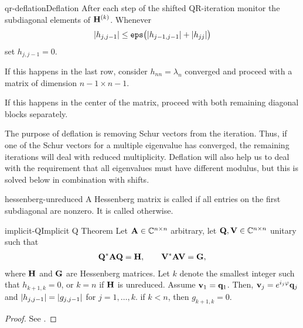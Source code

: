 \begin{Algorithm*}{qr-deflation}{Deflation}
  After each step of the shifted QR-iteration monitor the subdiagonal
  elements of $\mathbf H^{(k)}$. Whenever
  \begin{gather}
    \lvert h_{j,j-1}\rvert \le \texttt{eps} \bigl(\lvert h_{j-1,j-1}\rvert+\lvert h_{jj}\rvert\bigr)
  \end{gather}
  set $h_{j,j-1}=0$.

  If this happens in the last row, consider $h_{nn}=\lambda_n$
  converged and proceed with a matrix of dimension $n-1\times n-1$.

  If this happens in the center of the matrix, proceed with both
  remaining diagonal blocks separately.
\end{Algorithm*}

\begin{remark}
  The purpose of deflation is removing Schur vectors from the
  iteration. Thus, if one of the Schur vectors for a multiple
  eigenvalue has converged, the remaining iterations will deal with
  reduced multiplicity. Deflation will also help us to deal with the
  requirement that all eigenvalues must have different modulus, but
  this is solved below in combination with shifts.
\end{remark}

\begin{Definition}{hessenberg-unreduced}
  A Hessenberg matrix is called  if all entries on
  the first subdiagonal are nonzero. It is called 
  otherwise.
\end{Definition}

\begin{Theorem*}{implicit-Q}{Implicit Q Theorem}
  Let $\mathbf A\in\mathbb C^{n\times n}$ arbitrary, let $\mathbf Q,\mathbf V\in\mathbb C^{n\times n}$ unitary such that
  \begin{gather}
    \mathbf Q^*\mathbf A\mathbf Q = \mathbf H,\qquad \mathbf V^*\mathbf A\mathbf V = \mathbf G,
  \end{gather}
  where $\mathbf H$ and $\mathbf G$ are Hessenberg matrices. Let $k$ denote
  the smallest integer such that $h_{k+1,k} = 0$, or $k=n$ if $\mathbf H$
  is unreduced. Assume $\mathbf v_1 = \mathbf q_1$. Then,
  $\mathbf v_j = e^{i_j\varphi}\mathbf q_j$ and $\lvert h_{j,j-1}\rvert = \lvert g_{j,j-1}\rvert$
  for $j=1,\dots,k$. if $k<n$, then $g_{k+1,k} = 0$.
\end{Theorem*}

\begin{proof}
  See \cite[Theorem 7.4-2]{GolubVanLoan83}.
\end{proof}

